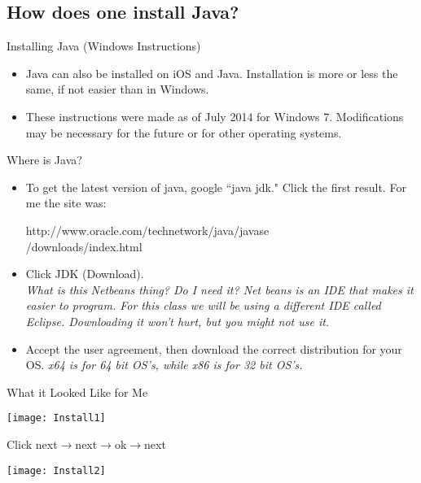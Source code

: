 \subsection{How does one install Java?}
\begin{frame}{Installing Java (Windows Instructions)}
\begin{itemize}
\item Java can also be installed on iOS and Java. Installation is more or less the same, if not easier than in Windows.
\item These instructions were made as of July 2014 for Windows 7. Modifications may be necessary for the future or for other operating systems.
\end{itemize}
\end{frame}

\begin{frame}{Where is Java?}
\begin{itemize}
\item To get the latest version of java, google ``java jdk." Click the first result. For me the site was:

    \begin{center}
    http://www.oracle.com/technetwork/java/javase\\
    /downloads/index.html
    \end{center}

\item Click JDK (Download). \\
\emph{What is this Netbeans thing? Do I need it? Net beans is an IDE that makes it easier to program. For this class we will be using a different IDE called Eclipse. Downloading it won't hurt, but you might not use it.}
\item Accept the user agreement, then download the correct distribution for your OS. \emph{x64 is for 64 bit OS's, while x86 is for 32 bit OS's.}
\end{itemize}
\end{frame}

\begin{frame}{What it Looked Like for Me}
\begin{center}
\texttt{[image: Install1]}
\end{center}
\end{frame}

\begin{frame}{Click next$\rightarrow$next$\rightarrow$ok$\rightarrow$next}
\begin{center}
\texttt{[image: Install2]}
\end{center}
\end{frame}

